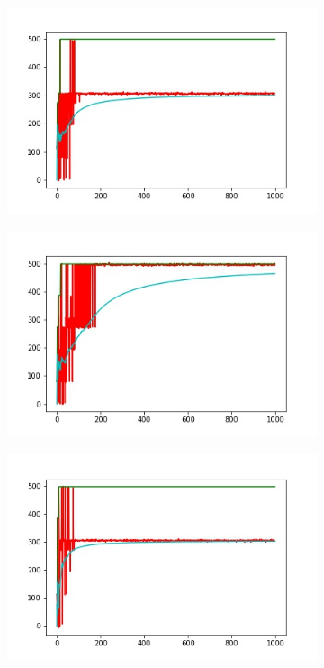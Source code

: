 \begin{figure}
\begin{subfigure}[b]{0.38\textwidth}
        \includegraphics[width=\textwidth]{grafi8.jpg}
        \label{fig:tiger}
    \end{subfigure}
    \begin{subfigure}[b]{0.38\textwidth}
        \includegraphics[width=\textwidth]{grafi9.jpg}
        \label{fig:mouse}
    \end{subfigure}
    \begin{subfigure}[b]{0.38\textwidth}
        \includegraphics[width=\textwidth]{grafi10.jpg}

\end{subfigure}
\end{figure}
